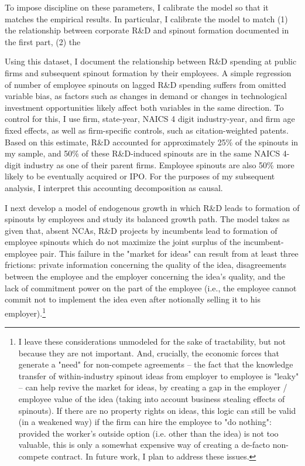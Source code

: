 \documentclass[12pt,english]{article}
\theoremstyle{remark}
\begin{document}
To impose discipline on these parameters, I calibrate the model so that it matches the empirical results. In particular, I calibrate the model to match (1) the relationship between corporate R\&D and spinout formation documented in the first part, (2) the 



Using this dataset, I document the relationship between R\&D spending at public firms and subsequent spinout formation by their employees. A simple regression of number of employee spinouts on lagged R\&D spending suffers from omitted variable bias, as factors such as changes in demand or changes in technological investment opportunities likely affect both variables in the same direction. To control for this, I use firm, state-year, NAICS 4 digit industry-year, and firm age fixed effects, as well as firm-specific controls, such as citation-weighted patents. Based on this estimate, R\&D accounted for approximately 25\% of the spinouts in my sample, and 50\% of these R\&D-induced spinouts are in the same NAICS 4-digit industry as one of their parent firms. Employee spinouts are also 50\% more likely to be eventually acquired or IPO. For the purposes of my subsequent analysis, I interpret this accounting decomposition as causal. 

I next develop a model of endogenous growth in which R\&D leads to formation of spinouts by employees and study its balanced growth path. The model takes as given that, absent NCAs, R\&D projects by incumbents lead to formation of employee spinouts which do not maximize the joint surplus of the incumbent-employee pair. This failure in the "market for ideas" can result from at least three frictions: private information concerning the quality of the idea, disagreements between the employee and the employer concerning the idea's quality, and the lack of commitment power on the part of the employee (i.e., the employee cannot commit not to implement the idea even after notionally selling it to his employer).\footnote{I leave these considerations unmodeled for the sake of tractability, but not because they are not important. And, crucially, the economic forces that generate a "need" for non-compete agreements -- the fact that the knowledge transfer of within-industry spinout ideas from employer to employee is "leaky" -- can help revive the market for ideas, by creating a gap in the employer / employee value of the idea (taking into account business stealing effects of spinouts). If there are no property rights on ideas, this logic can still be valid (in a weakened way) if the firm can hire the employee to "do nothing": provided the worker's outside option (i.e. other than the idea) is not too valuable, this is only a somewhat expensive way of creating a de-facto non-compete contract. In future work, I plan to address these issues.} 
\end{document}
